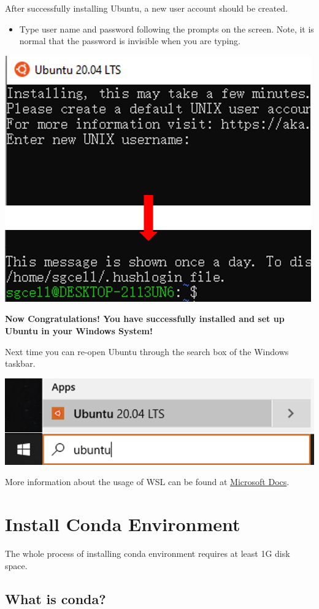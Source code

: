 \documentclass[
]{book}
\providecommand{\tightlist}{%
  \setlength{\itemsep}{0pt}\setlength{\parskip}{0pt}}
\begin{document}
After successfully installing Ubuntu, a new user account should be created.

\begin{itemize}
\tightlist
\item
  Type user name and password following the prompts on the screen. Note, it is normal that the password is invisible when you are typing.
\end{itemize}

\begin{center}\includegraphics[width=0.4\linewidth]{./images/wsl_create_account} \end{center}

\textbf{Now Congratulations! You have successfully installed and set up Ubuntu in your Windows System!}

Next time you can re-open Ubuntu through the search box of the Windows taskbar.

\begin{center}\includegraphics[width=0.35\linewidth]{./images/wsl_open_ubuntu} \end{center}

More information about the usage of WSL can be found at \href{https://docs.microsoft.com/en-us/windows/wsl}{Microsoft Docs}.

\hypertarget{conda_install}{%
\section{Install Conda Environment}\label{conda_install}}

The whole process of installing conda environment requires at least 1G disk space.

\hypertarget{what-is-conda}{%
\subsection{What is conda?}\label{what-is-conda}}
\end{document}
